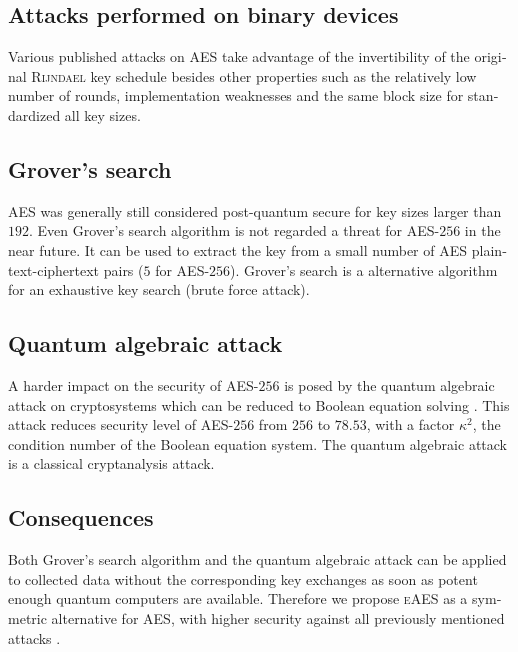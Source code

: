 \documentclass[a4paper,11pt]{article}
\begin{document}
\begin{otherlanguage}{english}
\subsection{Attacks performed on binary devices}
\noindent
Various published attacks on \textsc{AES} \cite{HFE, WEI, CRK} take advantage of the invertibility of the original \textsc{Rijndael} key schedule besides other properties such as the relatively low number of rounds, implementation weaknesses and the same block size for standardized all key sizes.

\subsection{Grover's search}
\noindent
\textsc{AES} was generally still considered post-quantum secure for key sizes larger than $192$. Even Grover’s search algorithm \cite{GRV} is not regarded a threat for \textsc{AES}-$256$ in the near future. It can be used to extract the key from a small number of \textsc{AES} plaintext-ciphertext pairs ($5$ for \textsc{AES}-$256$). Grover's search is a alternative algorithm for an exhaustive key search (brute force attack).

\subsection{Quantum algebraic attack}
\noindent
A harder impact on the security of \textsc{AES}-$256$ is posed by the quantum algebraic attack on cryptosystems which can be reduced to Boolean equation solving \cite{QAA}. This attack reduces security level of \textsc{AES}-$256$ from $256$ to $78.53$, with a factor $\kappa^2$, the condition number of the Boolean equation system. The quantum algebraic attack is a classical cryptanalysis attack.

\subsection{Consequences}
\noindent
Both Grover's search algorithm and the quantum algebraic attack can be applied to collected data without the corresponding key exchanges as soon as potent enough quantum computers are available. Therefore we propose \textsc{eAES} as a symmetric alternative for \textsc{AES}, with higher security against all previously mentioned attacks \cite{HFE,WEI,CRK,GRO,QAA}.\\



\end{otherlanguage}
\end{document}
